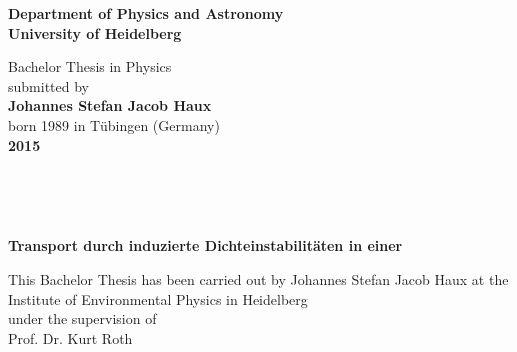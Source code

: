 \begin{titlepage}
\begin{center}
 
\Large\textbf{Department of Physics and Astronomy\\
University of Heidelberg}

\vspace{16cm}

\normalsize
Bachelor Thesis in Physics\\
submitted by \\
\vspace{0.5cm}
\Large\textbf{Johannes Stefan Jacob Haux}\\
\normalsize
\vspace{0.5cm}
born 1989 in Tübingen (Germany)\\
\vspace{0.5cm}
\Large\textbf{2015}
\normalsize

\clearpage
\thispagestyle{empty}

\newpage
\mbox{\,}
\newpage
{}%
\clearpage
\thispagestyle{empty}

\mbox{\,}

\vspace{2.5cm}

\Huge
\onehalfspacing

\textbf{Transport durch \COTm induzierte Dichteinstabilitäten in einer \HSC}

\normalsize
\singlespacing

\vspace{3cm}

% 


\vspace{7.5cm}

\normalsize
This Bachelor Thesis has been carried out by Johannes Stefan Jacob Haux at the\\
Institute of Environmental Physics in Heidelberg\\
under the supervision of\\
Prof. Dr. Kurt Roth

\vfill
\end{center}
\end{titlepage}

